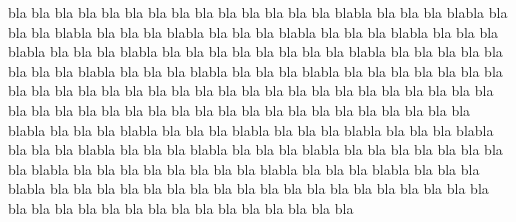 \documentclass[11pt,letter]{report}
\begin{document}
bla bla bla bla bla bla bla bla bla bla bla bla bla bla blabla bla bla bla blabla bla bla bla blabla bla bla bla blabla bla bla bla blabla bla bla bla blabla bla bla bla blabla bla bla bla blabla bla bla bla bla bla bla bla bla blabla bla bla bla bla bla bla bla bla blabla bla bla bla blabla bla bla bla blabla bla bla bla bla bla bla bla bla bla bla bla bla bla bla bla bla bla bla bla bla bla bla bla bla bla bla bla bla bla bla bla bla bla bla
bla bla bla bla bla bla bla bla bla bla bla bla bla bla blabla bla bla bla blabla bla bla bla blabla bla bla bla blabla bla bla bla blabla bla bla bla blabla bla bla bla blabla bla bla bla blabla bla bla bla bla bla bla bla bla blabla bla bla bla bla bla bla bla bla blabla bla bla bla blabla bla bla bla blabla bla bla bla bla bla bla bla bla bla bla bla bla bla bla bla bla bla bla bla bla bla bla bla bla bla bla bla bla bla bla bla bla bla bla
\end{document}
